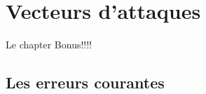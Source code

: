 
\chapter{Vecteurs d'attaques}

Le chapter Bonus!!!!

\section{Les erreurs courantes}
\label{Les erreurs courantes}




